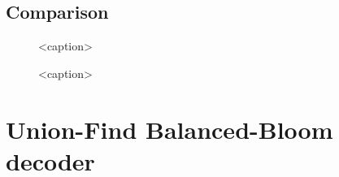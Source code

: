 \subsection{Comparison}\label{ap:figufcomp}
\begin{figure}[htbp]
  \centering
  \begin{subfigure}[b]{0.49\textwidth}
      
  \end{subfigure}
  \begin{subfigure}[b]{0.49\textwidth}
      
  \end{subfigure}
  \begin{subfigure}[b]{0.49\textwidth}
    
  \end{subfigure}
  \begin{subfigure}[b]{0.49\textwidth}
    
  \end{subfigure}
  \caption{<caption>}
  \label{fig:mwcomp_uf}
\end{figure}

\begin{figure}[htbp]
    \centering
    \begin{subfigure}[b]{0.49\textwidth}
      
    \end{subfigure}
    \begin{subfigure}[b]{0.49\textwidth}
      
    \end{subfigure}
    \caption{<caption>}
    \label{fig:tcomp_uf_3d}
  \end{figure}
\section{Union-Find Balanced-Bloom decoder}\label{ap:figufbb}

